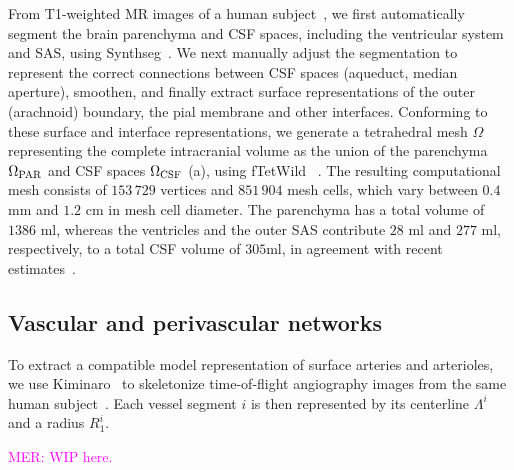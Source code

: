 \documentclass[fleqn,10pt]{wlscirep}
\newcommand{\mer}[1]{\textcolor{magenta}{#1}}
\newcommand{\mar}[1]{\textcolor{violet}{#1}}
\begin{document}
From T1-weighted MR images of a human subject~\cite{hodneland2019new},
we first automatically segment the brain parenchyma and CSF spaces,
including the ventricular system and SAS, using
Synthseg~\cite{billot2023robust,billot2023synthseg}. We next manually
adjust the segmentation to represent the correct connections between
CSF spaces (aqueduct, median aperture), smoothen, and finally extract
surface representations of the outer (arachnoid) boundary, the pial
membrane and other interfaces. Conforming to these surface and
interface representations, we generate a tetrahedral mesh $\Omega$
representing the complete intracranial volume as the union of the
parenchyma $\Omega_{\rm PAR}$ and CSF spaces $\Omega_{\rm CSF}$
(a), using fTetWild~\cite{hu2020fast}
. The resulting computational mesh consists of $153\,729$ vertices and
$851\,904$ mesh cells, which vary between $0.4$ mm and $1.2$ cm in
mesh cell diameter. The parenchyma has a total volume of $1386$ ml,
whereas the ventricles and the outer SAS contribute $28$ ml and $277$
ml, respectively, to a total CSF volume of $305$ml, in agreement with
recent estimates~\cite{hladky2024regulation}.



\subsection*{Vascular and perivascular networks}

To extract a compatible model representation of surface arteries and
arterioles, we use Kiminaro~\cite{william_silversmith_2021_5539913} to
skeletonize time-of-flight angiography images from the same human
subject~\cite{hodneland2019new}. Each vessel segment $i$ is then
represented by its centerline $\Lambda^i$ and a radius $R_1^i$. 

\mer{MER: WIP here.}

\end{document}
